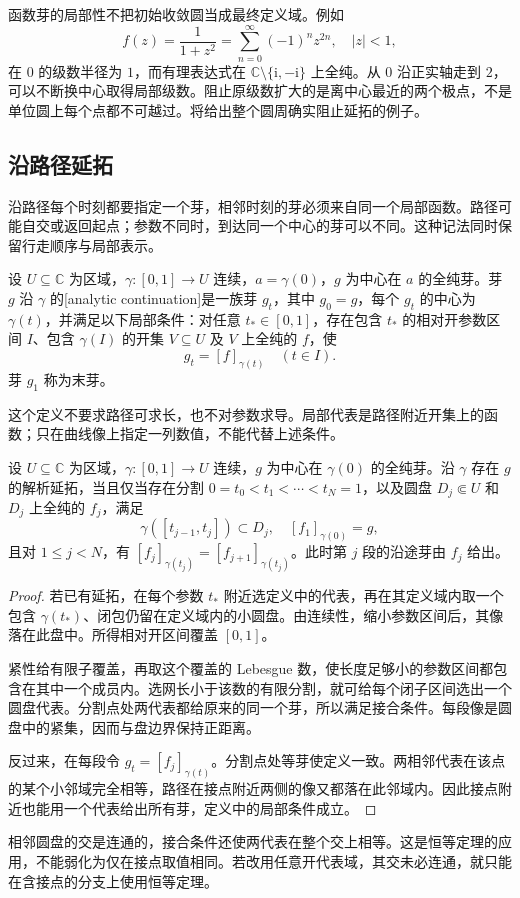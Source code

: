 \ProseParagraphBreak
函数芽的局部性不把初始收敛圆当成最终定义域。例如
\[
 f(z)=\frac1{1+z^2}=\sum_{n=0}^{\infty}(-1)^nz^{2n},\quad |z|<1,
\]
在 \(0\) 的级数半径为 \(1\)，而有理表达式在 \(\mathbb C\setminus\{\mathrm i,-\mathrm i\}\) 上全纯。从 \(0\) 沿正实轴走到 \(2\)，可以不断换中心取得局部级数。阻止原级数扩大的是离中心最近的两个极点，不是单位圆上每个点都不可越过。将给出整个圆周确实阻止延拓的例子。

\subsection{沿路径延拓}
\label{b3:subsec:090202}

沿路径每个时刻都要指定一个芽，相邻时刻的芽必须来自同一个局部函数。路径可能自交或返回起点；参数不同时，到达同一个中心的芽可以不同。这种记法同时保留行走顺序与局部表示。

\begin{definition}\label{b3:def:09-path-continuation}
设 \(U\subseteq\mathbb C\) 为区域，\(\gamma:[0,1]\to U\) 连续，\(a=\gamma(0)\)，\(g\) 为中心在 \(a\) 的全纯芽。芽 \(g\) 沿 \(\gamma\) 的[analytic continuation]是一族芽 \(g_t\)，其中 \(g_0=g\)，每个 \(g_t\) 的中心为 \(\gamma(t)\)，并满足以下局部条件：对任意 \(t_*\in[0,1]\)，存在包含 \(t_*\) 的相对开参数区间 \(I\)、包含 \(\gamma(I)\) 的开集 \(V\subseteq U\) 及 \(V\) 上全纯的 \(f\)，使
\[
 g_t=[f]_{\gamma(t)}\quad(t\in I).
\]
芽 \(g_1\) 称为末芽。
\end{definition}
这个定义不要求路径可求长，也不对参数求导。局部代表是路径附近开集上的函数；只在曲线像上指定一列数值，不能代替上述条件。

\begin{lemma}[有限代表链]\label{b3:lem:09-finite-chain}
设 \(U\subseteq\mathbb C\) 为区域，\(\gamma:[0,1]\to U\) 连续，\(g\) 为中心在 \(\gamma(0)\) 的全纯芽。沿 \(\gamma\) 存在 \(g\) 的解析延拓，当且仅当存在分割 \(0=t_0<t_1<\cdots<t_N=1\)，以及圆盘 \(D_j\Subset U\) 和 \(D_j\) 上全纯的 \(f_j\)，满足
\[
 \gamma([t_{j-1},t_j])\subset D_j,\quad [f_1]_{\gamma(0)}=g,
\]
且对 \(1\le j<N\)，有 \([f_j]_{\gamma(t_j)}=[f_{j+1}]_{\gamma(t_j)}\)。此时第 \(j\) 段的沿途芽由 \(f_j\) 给出。
\end{lemma}
\begin{proof}
若已有延拓，在每个参数 \(t_*\) 附近选定义中的代表，再在其定义域内取一个包含 \(\gamma(t_*)\)、闭包仍留在定义域内的小圆盘。由连续性，缩小参数区间后，其像落在此盘中。所得相对开区间覆盖 \([0,1]\)。

紧性给有限子覆盖，再取这个覆盖的 Lebesgue 数，使长度足够小的参数区间都包含在其中一个成员内。选网长小于该数的有限分割，就可给每个闭子区间选出一个圆盘代表。分割点处两代表都给原来的同一个芽，所以满足接合条件。每段像是圆盘中的紧集，因而与盘边界保持正距离。

反过来，在每段令 \(g_t=[f_j]_{\gamma(t)}\)。分割点处等芽使定义一致。两相邻代表在该点的某个小邻域完全相等，路径在接点附近两侧的像又都落在此邻域内。因此接点附近也能用一个代表给出所有芽，定义中的局部条件成立。
\end{proof}
相邻圆盘的交是连通的，接合条件还使两代表在整个交上相等。这是恒等定理的应用，不能弱化为仅在接点取值相同。若改用任意开代表域，其交未必连通，就只能在含接点的分支上使用恒等定理。

